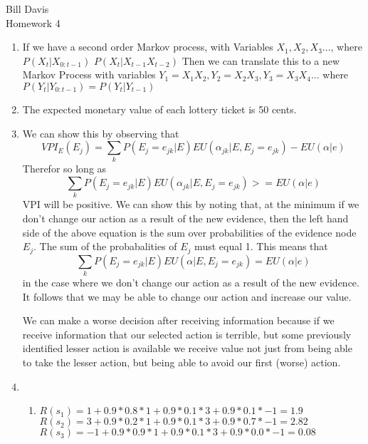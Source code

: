 \documentclass[11pt,fleqn]{article}
\begin{document}
\newcommand{\mbf}[1]{\mbox{{\bfseries #1}}}
\newcommand{\N}{\mbf{N}}
\renewcommand{\O}{\mbf{O}}

\noindent Bill Davis \\
Homework 4 

\begin{enumerate}
\item %
If we have a second order Markov process, with Variables $X_{1}, X_{2} , X_{3} ...$, where $P(X_{t}|X_{0:t-1})$ $P(X_{t}|X_{t-1}X_{t-2})$ Then we can translate this to a new Markov Process with variables $Y_{1}=X_{1}X_{2}, Y_{2}=X_{2}X_{3}, Y_{3}=X_{3}X_{4}...$ where $P(Y_{t}|Y_{0:t-1})=P(Y_{t}|Y_{t-1})$
\item %
The expected monetary value of each lottery ticket is 50 cents. \\
\item %
We can show this by observing that 
\[
VPI_{E}(E_{j}) = \displaystyle\sum_{k}P(E_{j}=e_{jk}|E)EU(\alpha_{jk}|E,E_{j}=e_{jk}) - EU(\alpha|e)
\]
Therefor so long as 
\[
\displaystyle\sum_{k}P(E_{j}=e_{jk}|E)EU(\alpha_{jk}|E,E_{j}=e_{jk}) >= EU(\alpha|e)
\]
VPI will be positive. We can show this by noting that, at the minimum if we don't change our action as a result of the new evidence, then the left hand side of the above equation is the sum over probabilities of the evidence node $E_{j}$. The sum of the probabalities of $E_{j}$ must equal 1. This means that 
\[
\displaystyle\sum_{k}P(E_{j}=e_{jk}|E)EU(\alpha|E,E_{j}=e_{jk}) = EU(\alpha|e)
\]
in the case where we don't change our action as a result of the new evidence. It follows that we may be able to change our action and increase our value. 

We can make a worse decision after receiving information because if we receive information that our selected action is terrible, but some previously identified lesser action is available we receive value not just from being able to take the lesser action, but being able to avoid our first (worse) action. 

\item %
\begin{enumerate}
\item 
$R(s_{1})=1 +0.9*0.8*1 + 0.9*0.1*3+ 0.9*0.1*-1 = 1.9$\\
$R(s_{2})=3 +0.9*0.2*1 + 0.9*0.1*3+ 0.9*0.7*-1 = 2.82$\\
$R(s_{3})=-1 +0.9*0.9*1 + 0.9*0.1*3+ 0.9*0.0*-1 = 0.08$\\


\end{enumerate}
\end{enumerate}
\end{document}
